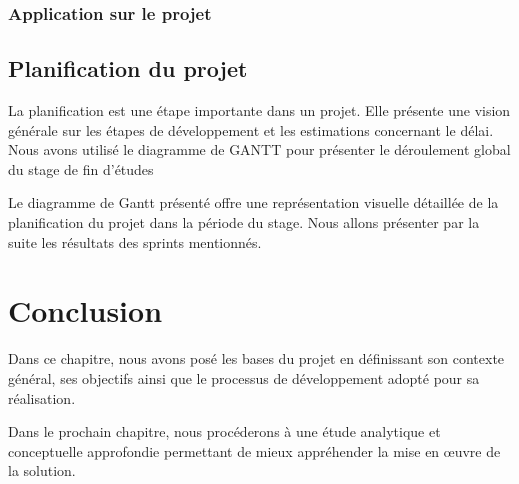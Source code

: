 \subsubsection{Application sur le projet}



\subsection{Planification du projet}
La planification est une étape importante dans un projet. Elle présente une vision générale sur les étapes de développement et les estimations concernant le délai. Nous avons utilisé le diagramme de GANTT pour présenter le déroulement global du stage de fin d'études 

Le diagramme de Gantt présenté offre une représentation visuelle détaillée de la planification du projet dans la période du stage. 
Nous allons présenter par la suite les résultats des sprints mentionnés.

\section*{Conclusion}

Dans ce chapitre, nous avons posé les bases du projet en définissant son contexte général, ses objectifs ainsi que le processus de développement adopté pour sa réalisation.

Dans le prochain chapitre, nous procéderons à une étude analytique et conceptuelle approfondie permettant de mieux appréhender la mise en œuvre de la solution.
